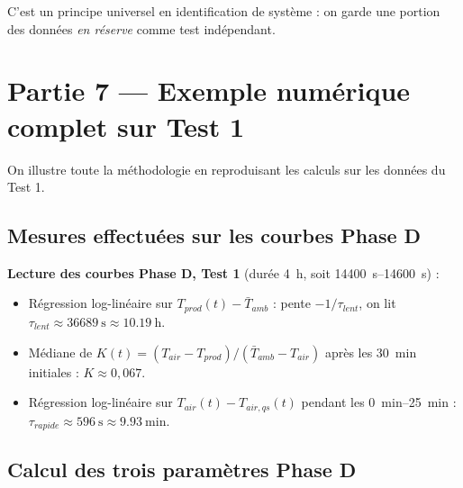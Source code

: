 \documentclass[11pt,a4paper]{article}
\begin{document}
C'est un principe universel en identification de système : on garde une portion des données
\emph{en réserve} comme test indépendant.

\section{Partie 7 — Exemple numérique complet sur Test 1}\label{sec:exemple}

On illustre toute la méthodologie en reproduisant les calculs sur les données du Test 1.

\subsection{Mesures effectuées sur les courbes Phase D}

\begin{exemple}
\textbf{Lecture des courbes Phase D, Test 1} (durée \SI{4}{\hour}, soit \SIrange{14400}{14600}{\second}) :
\begin{itemize}[itemsep=0pt]
\item Régression log-linéaire sur $T_{prod}(t) - \bar T_{amb}$ : pente
$-1/\tau_{lent}$, on lit $\tau_{lent} \approx \SI{36689}{\second} \approx \SI{10,19}{\hour}$.
\item Médiane de $K(t) = (T_{air} - T_{prod})/(\bar T_{amb} - T_{air})$ après les
\SI{30}{\minute} initiales : $K \approx 0{,}067$.
\item Régression log-linéaire sur $T_{air}(t) - T_{air,qs}(t)$ pendant les \SIrange{0}{25}{\minute} :
$\tau_{rapide} \approx \SI{596}{\second} \approx \SI{9,93}{\minute}$.
\end{itemize}
\end{exemple}

\subsection{Calcul des trois paramètres Phase D}
\end{document}
